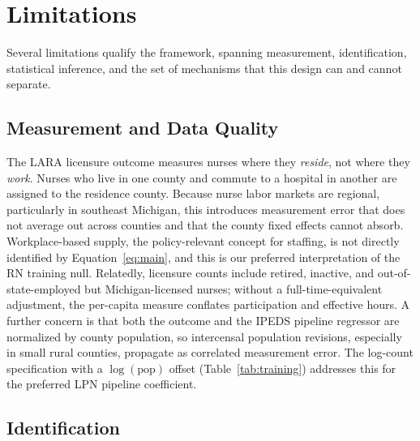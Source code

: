 \documentclass[12pt]{article}
\begin{document}
\section{Limitations}\label{sec:limits}

Several limitations qualify the framework, spanning measurement,
identification, statistical inference, and the set of mechanisms that this
design can and cannot separate.

\subsection{Measurement and Data Quality}

The LARA licensure outcome measures nurses where they \emph{reside}, not
where they \emph{work}. Nurses who live in one county and commute to a
hospital in another are assigned to the residence county. Because nurse
labor markets are regional, particularly in southeast Michigan, this
introduces measurement error that does not average out across counties and
that the county fixed effects cannot absorb. Workplace-based supply, the
policy-relevant concept for staffing, is not directly identified by
Equation~\eqref{eq:main}, and this is our preferred interpretation of the
RN training null. Relatedly, licensure counts include retired, inactive,
and out-of-state-employed but Michigan-licensed nurses; without a
full-time-equivalent adjustment, the per-capita measure conflates
participation and effective hours. A further concern is that both the
outcome and the IPEDS pipeline regressor are normalized by county
population, so intercensal population revisions, especially in small rural
counties, propagate as correlated measurement error. The log-count
specification with a $\log(\text{pop})$ offset (Table~\ref{tab:training})
addresses this for the preferred LPN pipeline coefficient.

\subsection{Identification}
\end{document}
